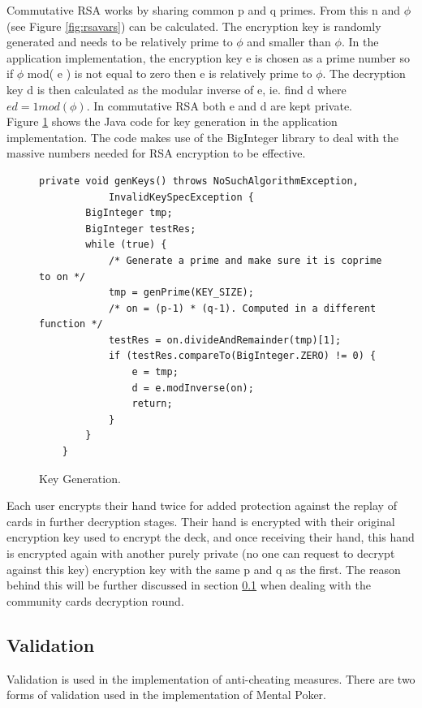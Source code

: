 \documentclass[11pt, oneside]{article}   	%
\begin{document}
Commutative RSA works by sharing common p and q primes. From this n and $\phi$ (see Figure \ref{fig:rsavars}) can be calculated. The encryption key is randomly generated and needs to be relatively prime to $\phi$ and smaller than $\phi$. In the application implementation, the encryption key e is chosen as a prime number so if $\phi$ mod( e ) is not equal to zero then e is relatively prime to $\phi$.  The decryption key d is then calculated as the modular inverse of e, ie. find d where $ed = 1 mod ( \phi)$. In commutative RSA both e and d are kept private.\\

Figure \ref{fig:code} shows the Java code for key generation in the application implementation. The code makes use of the BigInteger library to deal with the massive numbers needed for RSA encryption to be effective. 

\begin{figure}[H]
\caption{Key Generation.}
\begin{lstlisting}
private void genKeys() throws NoSuchAlgorithmException,
			InvalidKeySpecException {
		BigInteger tmp;
		BigInteger testRes;
		while (true) {
 			/* Generate a prime and make sure it is coprime to on */
			tmp = genPrime(KEY_SIZE);
			/* on = (p-1) * (q-1). Computed in a different function */
			testRes = on.divideAndRemainder(tmp)[1];
			if (testRes.compareTo(BigInteger.ZERO) != 0) {
				e = tmp;
				d = e.modInverse(on);
				return;
			}
		}
	}
\end{lstlisting}
\label{fig:code}
\end{figure}

Each user encrypts their hand twice for added protection against the replay of cards in further decryption stages. Their hand is encrypted with their original encryption key used to encrypt the deck, and once receiving their hand, this hand is encrypted again with another purely private (no one can request to decrypt against this key) encryption key with the same p and q as the first. The reason behind this will be further discussed in section \ref{sec:validation} when dealing with the community cards decryption round.

\subsection{Validation}
\label{sec:validation}

Validation is used in the implementation of anti-cheating measures. There are two forms of validation used in the implementation of Mental Poker.
\end{document}
